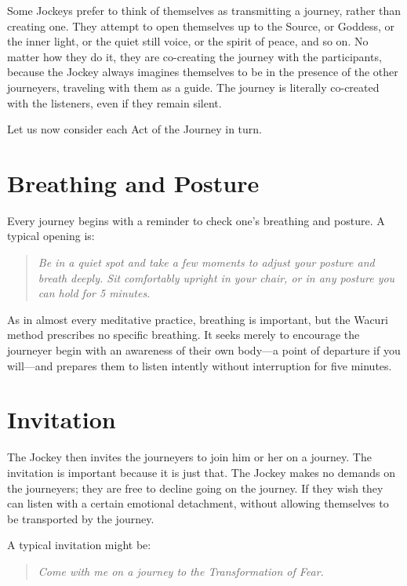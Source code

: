 \documentclass[12pt]{book}
\begin{document}
Some Jockeys prefer to think of themselves as transmitting a journey,
rather than creating one. They attempt to open themselves up to the Source, or
Goddess, or the inner light, or the quiet still voice, or the spirit
of peace, and so on. No matter how they do it, they are co-creating
the journey with the participants, because the Jockey always imagines
themselves to be in the presence of the other journeyers, traveling
with them as a guide. The journey is literally co-created with the
listeners, even if they remain silent.
					
Let us now consider each Act of the Journey in turn.
					
\section{Breathing and Posture}
					
Every journey begins with a reminder to check one’s breathing and posture. A typical opening is:
					
\begin{quote}{\em Be in a quiet spot and take a few moments to adjust your posture and breath deeply. Sit comfortably upright in your chair, or in any posture you can hold for 5 minutes.}
  \end{quote}
					
As in almost every meditative practice, breathing is important, but the Wacuri method prescribes no specific breathing. It seeks merely to encourage the journeyer begin with an awareness of their own body---a point of departure if you will--–and prepares them to listen intently without interruption for five minutes.
					
\section{Invitation}
					
The Jockey then invites the journeyers to join him or her on a journey. The invitation is important because it is just that. The Jockey makes no demands on the journeyers; they are free to decline going on the journey. If they wish they can listen with a certain emotional detachment, without allowing themselves to be transported by the journey.
					
A typical invitation might be:
\begin{quote}{\em 
    Come with me on a journey to the Transformation of Fear.}
  \end{quote}
					
\end{document}
